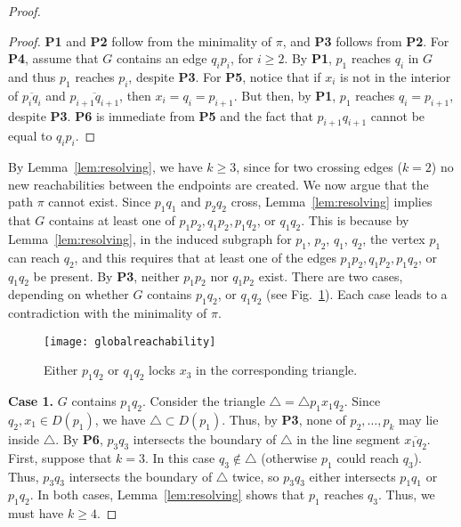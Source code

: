 \documentclass[11pt,a4paper]{paper}
\begin{document}
\begin{proof}
\begin{proof}
\textbf{P1} and \textbf{P2} follow from the minimality of $\pi$,
and \textbf{P3} follows from \textbf{P2}.
For \textbf{P4}, assume
that $G$ contains an edge $q_ip_i$, for $i \geq 2$.
By \textbf{P1}, $p_1$ reaches $q_i$ in $G$ and thus $p_1$ reaches $p_i$,
despite \textbf{P3}.
For \textbf{P5}, notice that if $x_i$ is not in the interior of 
$\overline{p_iq_i}$ and
$\overline{p_{i+1}q_{i+1}}$, then
$x_i = q_i = p_{i+1}$. But then, by \textbf{P1}, $p_1$ reaches
$q_i = p_{i+1}$, despite \textbf{P3}.
\textbf{P6}
is immediate from \textbf{P5} and the fact that 
$p_{i+1}q_{i+1}$ cannot be equal to $q_{i}p_i$.
\end{proof}

By Lemma~\ref{lem:resolving}, we have $k \geq 3$,
since for two crossing edges ($k = 2$) no new 
reachabilities between the endpoints are created.
We now argue that the path $\pi$ cannot exist.
Since $p_1q_1$ and $p_2q_2$ cross,
Lemma~\ref{lem:resolving} implies that $G$ contains at least one
of
$p_1p_2,q_1p_2,p_1q_2$,
or $q_1q_2$. This is because by Lemma~\ref{lem:resolving}, in the 
induced subgraph for $p_1$, $p_2$, $q_1$, $q_2$, the vertex 
$p_1$ can reach $q_2$, and this requires that at least one of the edges
$p_1p_2,q_1p_2,p_1q_2$, or $q_1q_2$ be present.
By \textbf{P3}, neither
$p_1p_2$ nor $q_1p_2$
exist.
There are two cases, depending on whether $G$ contains
$p_1q_2$, or $q_1q_2$
(see Fig.~\ref{fig:globalreachability}).
Each case  leads to a contradiction with the minimality of $\pi$.
\begin{figure}[htb]
\centering
\texttt{[image: globalreachability]}
\caption{Either $p_1q_2$ or $q_1q_2$ locks $x_3$ in
the corresponding triangle.}
\label{fig:globalreachability}
\end{figure}

\textbf{Case 1.} $G$ contains $p_1q_2$.
Consider the triangle $\triangle = \triangle p_1x_1q_2$.
Since $q_2,x_1 \in D(p_1)$, we have
$\triangle \subset D(p_1)$.
Thus, by \textbf{P3}, none of $p_2,\dots,p_k$
may lie inside $\triangle$.
By \textbf{P6}, $p_3q_3$
intersects the boundary of $\triangle$ in the line segment
$\overline{x_1q_2}$.
First, suppose that $k = 3$. In this case
$ q_3 \not\in \triangle$ (otherwise $p_1$ could reach $q_3$).
Thus, $p_3q_3$ intersects the boundary of $\triangle$
twice, so $p_3q_3$ either intersects
 $p_1q_1$ or $p_1q_2$.
In both cases, Lemma~\ref{lem:resolving} shows that $p_1$ reaches
$q_3$. Thus, we must have $k \geq 4$.


\end{proof}
\end{document}
